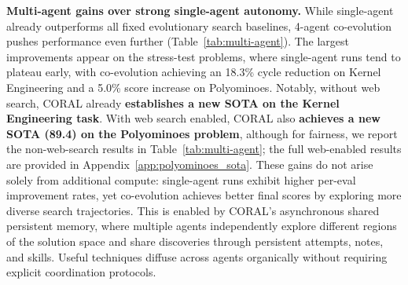 \textbf{Multi-agent gains over strong single-agent autonomy.}
While single-agent \method{} already outperforms all fixed evolutionary search baselines, 4-agent co-evolution pushes performance even further (Table~\ref{tab:multi-agent}). The largest improvements appear on the stress-test problems, where single-agent runs tend to plateau early, with co-evolution achieving an 18.3\% cycle reduction on Kernel Engineering and a 5.0\% score increase on Polyominoes. Notably, without web search, CORAL already \textbf{establishes a new SOTA on the Kernel Engineering task}. With web search enabled, CORAL also \textbf{achieves a new SOTA (89.4) on the Polyominoes problem}, although for fairness, we report the non-web-search results in Table~\ref{tab:multi-agent}; the full web-enabled results are provided in Appendix~\ref{app:polyominoes_sota}. These gains do not arise solely from additional compute: single-agent runs exhibit higher per-eval improvement rates, yet co-evolution achieves better final scores by exploring more diverse search trajectories. This is enabled by CORAL's asynchronous shared persistent memory, where multiple agents independently explore different regions of the solution space and share discoveries through persistent attempts, notes, and skills. Useful techniques diffuse across agents organically without requiring explicit coordination protocols. 

